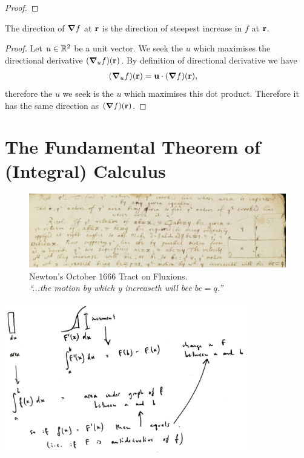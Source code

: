 \begin{proof}
  \todo{}
\end{proof}

\begin{theorem*}
  The direction of $\grad f$ at $\mathbf{r}$ is the direction of steepest increase in $f$ at $\mathbf{r}$.
\end{theorem*}

\begin{proof}
  Let $u \in \mathbb{R}^2$ be a unit vector. We seek the $u$ which maximises the directional derivative
  $(\grad_u f)(\mathbf{r})$. By definition of directional derivative we have
  \begin{align*}
    (\grad_u f)(\mathbf{r}) &= \mathbf{u} \cdot (\grad f)(\mathbf{r}),
  \end{align*}
  therefore the $u$ we seek is the $u$ which maximises this dot product. Therefore it has the same
  direction as $(\grad f)(\mathbf{r})$.
\end{proof}




\newpage
\section{The Fundamental Theorem of (Integral) Calculus}

\begin{figure}[h]
  \centering
  \includegraphics[width=500pt]{img/newton-october-1666-tract-ftc.png}
  \captionsetup{labelformat=empty,justification=centering}
  \caption[xxx]{Newton's October 1666 Tract on Fluxions.\\
    \emph{``...the motion by which y increaseth will bee $bc = q$.''}}
\end{figure}

\includegraphics[width=300pt]{img/ftc.png}

